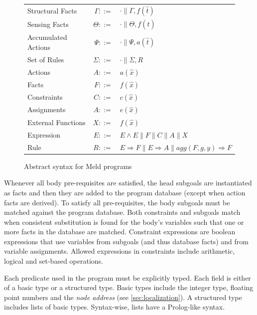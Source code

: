 \documentclass[preprint]{sigplanconf}
\begin{document}
\newcommand{\synlineend}{\\[.5ex]}
\begin{figure}
\small
\begin{tabular}{lrl}
Structural Facts & $\Gamma ::=$ & $\cdot \| \Gamma,f(\hat t)$  \synlineend

Sensing Facts & $\Theta ::=$ & $\cdot \| \Theta,f(\hat t)$ \synlineend

Accumulated Actions & $\Psi ::=$ & $\cdot \| \Psi,a(\hat t)$  \synlineend

Set of Rules & $\Sigma ::=$ & $\cdot \| \Sigma,R$ \synlineend

Actions & $A ::=$ & $a(\hat x)$ \synlineend

Facts & $F ::=$ & $f(\hat x)$ \synlineend

Constraints & $C ::=$ & $c(\hat x)$ \synlineend

Assignments & $A ::=$ & $e(\hat x)$ \synlineend

External Functions & $X ::=$ & $f(\hat x)$ \synlineend

Expression & $E ::=$ & $E \wedge E \| F \| C \| A \| X$ \synlineend

Rule
& $R ::=$ & $E \Rightarrow F \| E \Rightarrow A \| agg(F, g, y) \Rightarrow F$ \synlineend
\end{tabular}
\vspace*{-1ex}
\caption{Abstract syntax for Meld programs}
\vspace*{-2ex}
\label{fig:definitions}
\end{figure}

Whenever all body pre-requisites are satisfied, the head subgoals are instantiated as
facts and then they are added to the program database (except when action facts are derived).
To satisfy all pre-requisites, the body
subgoals must be matched against the program database. Both constraints and subgoals
match when consistent substitution is found for the body's variables such that one or
more facts in the database are matched. Constraint expressions are boolean expressions that
use variables from subgoals (and thus database facts) and from variable assignments. Allowed
expressions in constraints include arithmetic, logical and set-based operations.

Each predicate used in the program must be explicitly typed. Each field is either of a basic
type or a structured type. Basic types include the integer type, floating point numbers and
the \emph{node address} (see \ref{sec:localization}).
A structured type includes lists of basic types. Syntax-wise, lists have a Prolog-like syntax.
\end{document}
